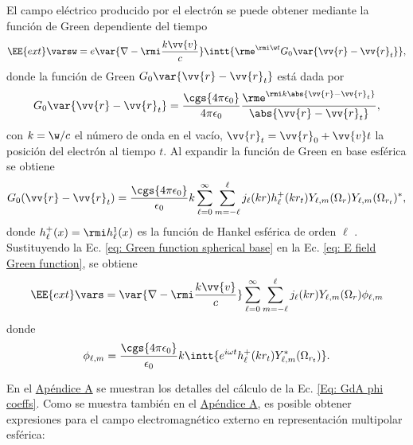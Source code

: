 El campo eléctrico producido por el electrón se puede obtener mediante la función de Green dependiente del tiempo \cite{maciel2019electromagnetic}  
\begin{equation}
\EE{ext}\varsw = e\var{\nabla-\rmi \frac{k\vv{v}}{c}} \intt{\rme^{\rmi \w t} G_0 \var{\vv{r}-\vv{r}_t}},
\label{eq: E field Green function}
\end{equation}
donde la función de Green $G_0 \var{\vv{r}-\vv{r}_t}$ está dada por 
\begin{equation}
G_0 \var{\vv{r}-\vv{r}_t} = \frac{\cgs{4\pi\epsilon_0}}{4\pi\epsilon_0}\frac{\rme^{\rmi k \abs{\vv{r}-\vv{r}_t}}}{\abs{\vv{r}-\vv{r}_t}},
\end{equation}
con $k = \w/c$ el número de onda en el vacío, $\vv{r}_t=\vv{r}_0+\vv{v}t$ la posición del electrón al tiempo $t$. Al expandir la función de Green en base esférica se obtiene \cite{de1999relativistic}
\begin{equation}
G_0(\vv{r}-\vv{r}_t) = \frac{\cgs{4\pi\epsilon_0}}{\epsilon_0} k \sum_{\ell = 0}^{\infty} \sum_{m=-\ell}^{\ell} j_{\ell}(kr) h_{\ell}^{+}(k r_t) Y_{\ell, m}(\Omega_r) Y_{\ell, m}(\Omega_{r_t})^{*},
\label{eq: Green function spherical base}
\end{equation}
donde $h_{\ell}^{+}(x) = \rmi h_{\ell}^{1}(x)$ es la función de Hankel esférica de orden $\ell$ \citep{Abramowitz}. Sustituyendo la Ec. \eqref{eq: Green function spherical base} en la Ec. \eqref{eq: E field Green function}, se obtiene
\begin{equation}
\EE{ext}\vars = \var{\nabla-\rmi \frac{k\vv{v}}{c}} \sum_{\ell = 0}^{\infty} \sum_{m=-\ell}^{\ell} j_{\ell}(kr) Y_{\ell, m}(\Omega_{r})\phi_{\ell, m}
\end{equation}
donde 
\begin{equation}
\phi_{\ell, m} = \frac{\cgs{4\pi\epsilon_0}}{\epsilon_0} k \intt{e^{i \omega t} h_{\ell}^{+}(k r_{t}) Y_{\ell, m}^{*}(\Omega_{r_t}) }.
\label{Eq: GdA phi coeffs}
\end{equation}

En el \hyperref[AppendixScalarPotentials]{Apéndice A} se muestran los detalles del cálculo de la Ec. \eqref{Eq: GdA phi coeffs}. Como se muestra también en el \hyperref[AppendixScalarPotentials]{Apéndice A}, es posible obtener expresiones para el campo electromagnético externo en representación multipolar esférica:

